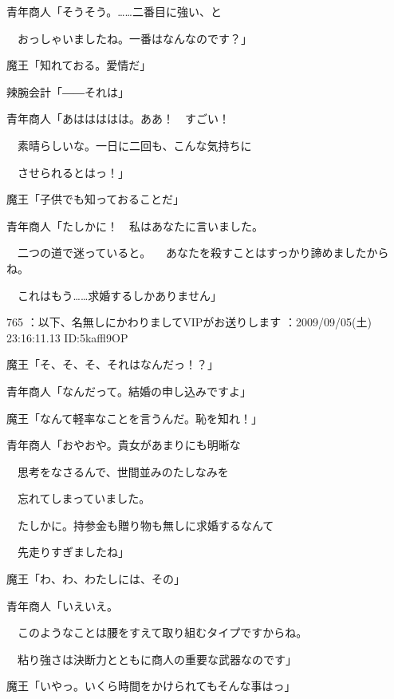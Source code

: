 \documentclass[a4j,twocolumn]{tarticle}
\begin{document}
青年商人「そうそう。……二番目に強い、と\par{} 
　おっしゃいましたね。一番はなんなのです？」 



魔王「知れておる。愛情だ」 



辣腕会計「――それは」\par{} 
青年商人「あははははは。ああ！　すごい！ \par{}
　素晴らしいな。一日に二回も、こんな気持ちに\par{} 
　させられるとはっ！」 



魔王「子供でも知っておることだ」 



青年商人「たしかに！　私はあなたに言いました。\par{} 
　二つの道で迷っていると。 
　あなたを殺すことはすっかり諦めましたからね。\par{} 
　これはもう……求婚するしかありません」 

	
    
    

765 ：以下、名無しにかわりましてVIPがお送りします ：2009/09/05(土) 23:16:11.13 ID:5kaffl9OP 


魔王「そ、そ、そ、それはなんだっ！？」 



青年商人「なんだって。結婚の申し込みですよ」 



魔王「なんて軽率なことを言うんだ。恥を知れ！」 



青年商人「おやおや。貴女があまりにも明晰な\par{} 
　思考をなさるんで、世間並みのたしなみを\par{} 
　忘れてしまっていました。\par{} 
　たしかに。持参金も贈り物も無しに求婚するなんて\par{} 
　先走りすぎましたね」 



魔王「わ、わ、わたしには、その」 



青年商人「いえいえ。\par{} 
　このようなことは腰をすえて取り組むタイプですからね。\par{} 
　粘り強さは決断力とともに商人の重要な武器なのです」 



魔王「いやっ。いくら時間をかけられてもそんな事はっ」 
\end{document}
